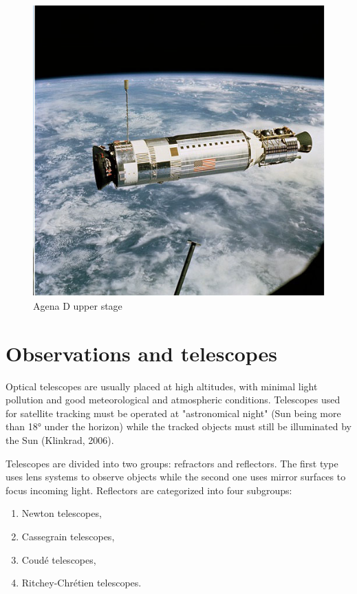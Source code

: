\begin{figure}[H]
  \includegraphics[width=\linewidth]{images/upperstage}
  \caption{Agena D upper stage}
  \label{fig:upperstage}
\end{figure}
	
\pagebreak


\section{Observations and telescopes}\label{sec:observations_telescopes}

Optical telescopes are usually placed at high altitudes, with minimal light pollution and good meteorological and atmospheric conditions. Telescopes used for satellite tracking must be operated at "astronomical night" (Sun being more than 18° under the horizon) while the tracked objects must still be illuminated by the Sun (Klinkrad, 2006).

	Telescopes are divided into two groups: refractors and reflectors. The first type uses lens systems to observe objects while the second one uses mirror surfaces to focus incoming light. Reflectors are categorized into four subgroups:
	
\begin{enumerate}
	\item Newton telescopes,
	\item Cassegrain telescopes,
	\item Coudé telescopes,
	\item Ritchey-Chrétien telescopes.
\end{enumerate}
	
